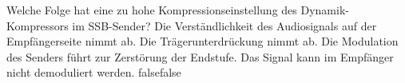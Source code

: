     {Welche Folge hat eine zu hohe Kompressionseinstellung des Dynamik-Kompressors im SSB-Sender?}
    {Die Verständlichkeit des Audiosignals auf der Empfängerseite nimmt ab.}
    {Die Trägerunterdrückung nimmt ab.}
    {Die Modulation des Senders führt zur Zerstörung der Endstufe.}
    {Das Signal kann im Empfänger nicht demoduliert werden.}
    {false}{false}